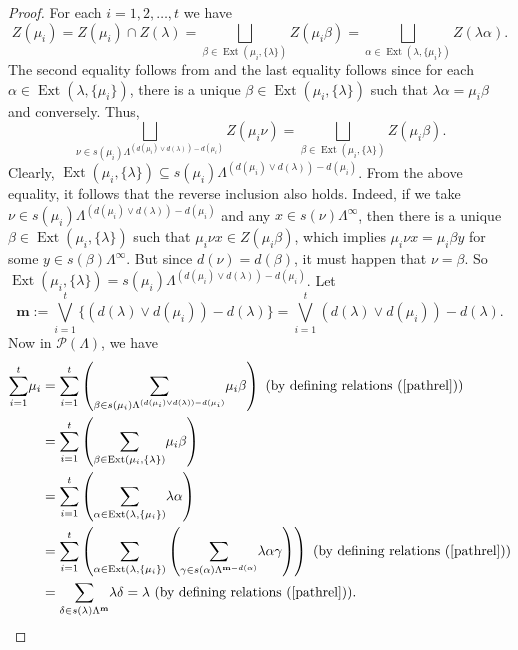 \documentclass[12pt]{amsart}
\newcommand{\M}{\mathbf{m}}
\theoremstyle{definition}
\theoremstyle{remark}
\newcommand{\Ext}{\operatorname{Ext}}
\begin{document}
\begin{proof}
For each $i=1,2,\ldots,t$ we have
\[Z(\mu_i)=Z(\mu_i)\cap Z(\lambda)=\displaystyle{\bigsqcup_{\beta\in \Ext(\mu_i,\{\lambda\})}} Z(\mu_i\beta)=\displaystyle{\bigsqcup_{\alpha\in \Ext(\lambda,\{\mu_i\})}}Z(\lambda\alpha).\] The second equality follows from \cite[Lemma 3.17 $(i)$]{HMPS} and the last equality follows since for each $\alpha\in \Ext(\lambda,\{\mu_i\})$, there is a unique $\beta\in \Ext(\mu_i,\{\lambda\})$ such that $\lambda\alpha=\mu_i\beta$ and conversely. Thus, \[\displaystyle{\bigsqcup_{\nu\in s(\mu_i)\Lambda^{(d(\mu_i)\vee d(\lambda))-d(\mu_i)}}} Z(\mu_i\nu)=\displaystyle{\bigsqcup_{\beta\in \Ext(\mu_i,\{\lambda\})}} Z(\mu_i\beta).\] Clearly, $\Ext(\mu_i,\{\lambda\})\subseteq s(\mu_i)\Lambda^{(d(\mu_i)\vee d(\lambda))-d(\mu_i)}$. From the above equality, it follows that the reverse inclusion also holds. Indeed, if we take $\nu\in s(\mu_i)\Lambda^{(d(\mu_i)\vee d(\lambda))-d(\mu_i)}$ and any $x\in s(\nu)\Lambda^\infty$, then there is a unique $\beta\in \Ext(\mu_i,\{\lambda\})$ such that $\mu_i\nu x\in Z(\mu_i\beta)$, which implies $\mu_i\nu x=\mu_i\beta y$ for some $y\in s(\beta)\Lambda^\infty$. But since $d(\nu)=d(\beta)$, it must happen that $\nu=\beta$. So $\Ext(\mu_i,\{\lambda\})=s(\mu_i)\Lambda^{(d(\mu_i)\vee d(\lambda))-d(\mu_i)}$. Let \[\M:=\displaystyle{\bigvee_{i=1}^{t}} \{(d(\lambda)\vee d(\mu_i))-d(\lambda)\}=\displaystyle{\bigvee_{i=1}^{t}}(d(\lambda)\vee d(\mu_i))-d(\lambda).\] Now in $\mathcal{P}(\Lambda)$, we have
\begin{align*}
\displaystyle{\sum_{i=1}^{t}}\mu_i&= \displaystyle{\sum_{i=1}^{t}}\left(\displaystyle{\sum_{\beta\in s(\mu_i)\Lambda^{(d(\mu_i)\vee d(\lambda))-d(\mu_i)}}}\mu_i\beta\right)~(\text{by defining relations (\ref{pathrel})})\\
&=\displaystyle{\sum_{i=1}^{t}}\left(\displaystyle{\sum_{\beta\in \Ext(\mu_i,\{\lambda\})}} \mu_i\beta\right)\\
&=\displaystyle{\sum_{i=1}^{t}}\left(\displaystyle{\sum_{\alpha\in \Ext(\lambda,\{\mu_i\})}} \lambda\alpha\right)\\
&=\displaystyle{\sum_{i=1}^{t}}\left(\displaystyle{\sum_{\alpha\in \Ext(\lambda,\{\mu_i\})}} \left(\displaystyle{\sum_{\gamma\in s(\alpha)\Lambda^{\M-d(\alpha)}}}\lambda\alpha\gamma\right)\right)~(\text{by defining relations (\ref{pathrel})})\\
&=\displaystyle{\sum_{\delta\in s(\lambda)\Lambda^\M}}\lambda\delta=\lambda~(\text{by defining relations (\ref{pathrel})}).
\end{align*}

\end{proof}
\end{document}
